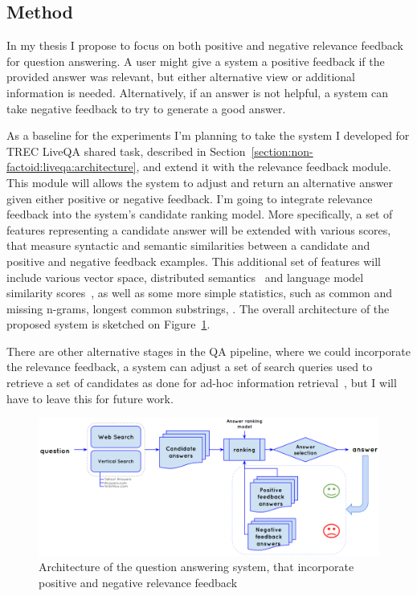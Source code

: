 \subsection{Method}
\label{section:users:proposal:method}

In my thesis I propose to focus on both positive and negative relevance feedback for question answering.
A user might give a system a positive feedback if the provided answer was relevant, but either alternative view or additional information is needed.
Alternatively, if an answer is not helpful, a system can take negative feedback to try to generate a good answer.

As a baseline for the experiments I'm planning to take the system I developed for TREC LiveQA shared task, described in Section~\ref{section:non-factoid:liveqa:architecture}, and extend it with the relevance feedback module.
This module will allows the system to adjust and return an alternative answer given either positive or negative feedback.
I'm going to integrate relevance feedback into the system's candidate ranking model.
More specifically, a set of features representing a candidate answer will be extended with various scores, that measure syntactic and semantic similarities between a candidate and positive and negative feedback examples.
This additional set of features will include various vector space, distributed semantics~\cite{kusner2015word} and language model similarity scores~\cite{wang2008study}, as well as some more simple statistics, such as common and missing n-grams, longest common substrings, \etc.
The overall architecture of the proposed system is sketched on Figure~\ref{figure:users:proposal:model}.

There are other alternative stages in the QA pipeline, where we could incorporate the relevance feedback, \eg a system can adjust a set of search queries used to retrieve a set of candidates as done for ad-hoc information retrieval~\cite{rocchio1971relevance}, but I will have to leave this for future work.

\begin{figure}
\centering
\includegraphics[width=\textwidth]{img/userfeedback_model}
\caption{Architecture of the question answering system, that incorporate positive and negative relevance feedback}
\label{figure:users:proposal:model}
\end{figure}

